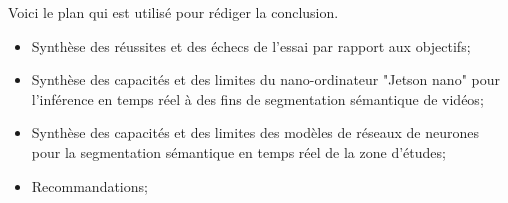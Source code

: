 {\color{red}
\par Voici le plan qui est utilisé pour rédiger la conclusion.
\begin{itemize}
   \item Synthèse des réussites et des échecs de l'essai par rapport aux objectifs;
   \item Synthèse des capacités et des limites du nano-ordinateur "Jetson nano" pour l'inférence en temps réel à des fins de segmentation sémantique de vidéos;
   \item Synthèse des capacités et des limites des modèles de réseaux de neurones pour la segmentation sémantique en temps réel de la zone d’études;
   \item Recommandations;
\end{itemize}
}